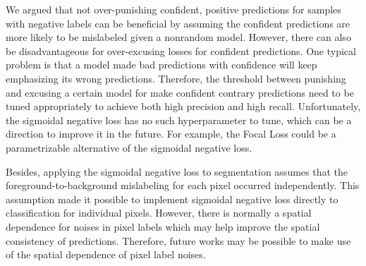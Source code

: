 We argued that not over-punishing confident, positive predictions for samples with negative labels can be beneficial by assuming the confident predictions are more likely to be mislabeled given a nonrandom model.
However, there can also be disadvantageous for over-excusing losses for confident predictions.
One typical problem is that a model made bad predictions with confidence will keep emphasizing its wrong predictions.
Therefore, the threshold between punishing and excusing a certain model for make confident contrary predictions need to be tuned appropriately to achieve both high precision and high recall.
Unfortunately, the sigmoidal negative loss has no such hyperparameter to tune, which can be a direction to improve it in the future.
For example, the Focal Loss\cite{lin2017focal} could be a parametrizable alternative of the sigmoidal negative loss.

Besides, applying the sigmoidal negative loss to segmentation assumes that the foreground-to-background mislabeling for each pixel occurred independently.
This assumption made it possible to implement sigmoidal negative loss directly to classification for individual pixels.
However, there is normally a spatial dependence for noises in pixel labels which may help improve the spatial consistency of predictions.
Therefore, future works may be possible to make use of the spatial dependence of pixel label noises.


%

